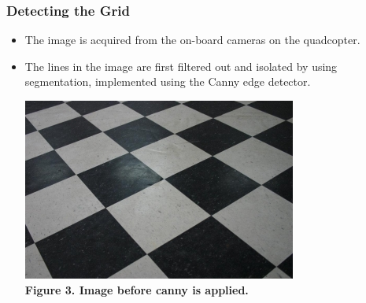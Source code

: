 \documentclass[12pt]{article}
\begin{document}
\subsubsection{Detecting the Grid}
\begin{itemize}
  \item The image is acquired from the on-board cameras on the quadcopter.
  \item The lines in the image are first filtered out and isolated by using segmentation, implemented using the Canny edge detector. 
    \begin{center}\includegraphics{image25} \\
    \textbf{Figure 3. Image before canny is applied.}\end{center}
    

\end{itemize}
\end{document}
